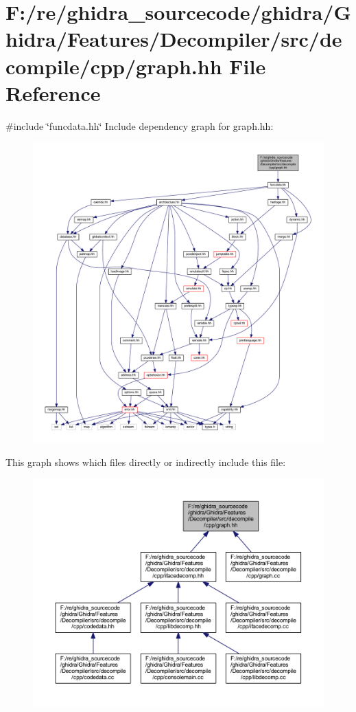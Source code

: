 \hypertarget{graph_8hh}{}\section{F\+:/re/ghidra\+\_\+sourcecode/ghidra/\+Ghidra/\+Features/\+Decompiler/src/decompile/cpp/graph.hh File Reference}
\label{graph_8hh}
{\ttfamily \#include \char`\"{}funcdata.\+hh\char`\"{}}\newline
Include dependency graph for graph.\+hh\+:
\nopagebreak
\begin{figure}[H]
\begin{center}
\leavevmode
\includegraphics[width=350pt]{graph_8hh__incl}
\end{center}
\end{figure}
This graph shows which files directly or indirectly include this file\+:
\nopagebreak
\begin{figure}[H]
\begin{center}
\leavevmode
\includegraphics[width=350pt]{graph_8hh__dep__incl}
\end{center}
\end{figure}
